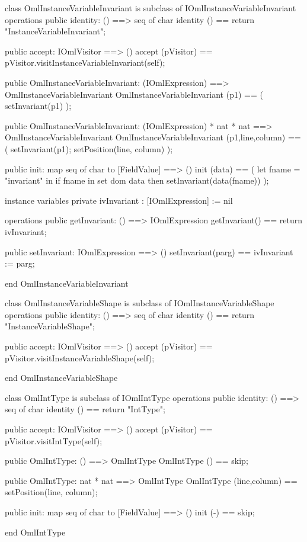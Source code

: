 \begin{vdm_al}
class OmlInstanceVariableInvariant is subclass of IOmlInstanceVariableInvariant
operations
  public identity: () ==> seq of char
  identity () == return "InstanceVariableInvariant";

  public accept: IOmlVisitor ==> ()
  accept (pVisitor) == pVisitor.visitInstanceVariableInvariant(self);

  public OmlInstanceVariableInvariant:
    (IOmlExpression) ==> OmlInstanceVariableInvariant
  OmlInstanceVariableInvariant (p1) == 
    ( setInvariant(p1) );

  public OmlInstanceVariableInvariant:
    (IOmlExpression) *
    nat *
    nat ==> OmlInstanceVariableInvariant
  OmlInstanceVariableInvariant (p1,line,column) == 
    ( setInvariant(p1);
      setPosition(line, column) );

  public init: map seq of char to [FieldValue] ==> ()
  init (data) ==
    ( let fname = "invariant" in
        if fname in set dom data
        then setInvariant(data(fname)) );

instance variables
  private ivInvariant : [IOmlExpression] := nil

operations
  public getInvariant: () ==> IOmlExpression
  getInvariant() == return ivInvariant;

  public setInvariant: IOmlExpression ==> ()
  setInvariant(parg) == ivInvariant := parg;

end OmlInstanceVariableInvariant
\end{vdm_al}

\begin{vdm_al}
class OmlInstanceVariableShape is subclass of IOmlInstanceVariableShape
operations
  public identity: () ==> seq of char
  identity () == return "InstanceVariableShape";

  public accept: IOmlVisitor ==> ()
  accept (pVisitor) == pVisitor.visitInstanceVariableShape(self);

end OmlInstanceVariableShape
\end{vdm_al}
\begin{vdm_al}
class OmlIntType is subclass of IOmlIntType
operations
  public identity: () ==> seq of char
  identity () == return "IntType";

  public accept: IOmlVisitor ==> ()
  accept (pVisitor) == pVisitor.visitIntType(self);

  public OmlIntType:
    () ==> OmlIntType
  OmlIntType () == 
    skip;

  public OmlIntType:
    nat *
    nat ==> OmlIntType
  OmlIntType (line,column) == 
    setPosition(line, column);

  public init: map seq of char to [FieldValue] ==> ()
  init (-) == skip;

end OmlIntType
\end{vdm_al}

